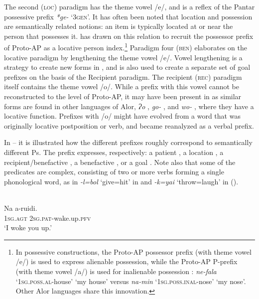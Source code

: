 \documentclass[output=paper]{LSP/langsci}
\begin{document}
The second (\textsc{loc}) paradigm has the theme vowel /e/, and is a reflex of the  Pantar possessive prefix \textit{*ge-} ‘\textsc{3gen}’. It has often been noted that location and possession are semantically related notions: an item is typically located at or near the person that possesses it.  has drawn on this relation to recruit the possessor prefix of Proto-AP as a locative person index.\footnote{In  possessive constructions, the Proto-AP possessor prefix (with theme vowel /e/) is used to express alienable possession, while the
 Proto-AP P-prefix (with theme vowel /a/) is used for inalienable possession \citep{Kratochvil2007Grammar}: \textit{ne-fala} ‘1\textsc{sg}.\textsc{poss}.\textsc{al}-house’ ‘my house’ versus \textit{na-min} ‘1\textsc{sg}.\textsc{poss}.\textsc{inal}-nose’ ‘my nose’. Other Alor languages share this innovation.} Paradigm four (\textsc{ben}) elaborates on the locative paradigm by lengthening the theme vowel /e/. Vowel lengthening is a strategy to create new forms in , and is also used to create a separate set of goal prefixes on the basis of the Recipient paradigm. The recipient (\textsc{rec}) paradigm itself contains the theme vowel /o/. While a prefix with this vowel cannot be reconstructed to the level of Proto-AP, it may have been present in  as similar forms are found in other languages of Alor, \eg {} \textit{Ɂo} \citep{Haan2001Grammar},  \textit{go-} \citep{Baird2008Grammar}, and  \textit{wo-} \citep{Schapper2014Kamang}, where they have a locative
function. Prefixes with /o/ might have evolved from a word that was
originally locative postposition or verb, and became reanalyzed as a
verbal prefix.

In -- it is illustrated how the different  prefixes roughly correspond to semantically different Ps. The prefix expresses, respectively: a patient , a location , a recipient/benefactive , a benefactive , or a goal . Note also that some of the predicates are complex, consisting of two or more verbs forming a single phonological word, as in \emph{-l=bol} `give=hit' in  and \emph{-k=yai} `throw=laugh' in  (\cf \citealt{Klameretal2010Abui}).

\newpage  
\ea {}\\
\ea \label{03-kl-ex:17}
\gll Na a-ruidi.\\
1\textsc{sg}.\textsc{agt} 2\textsc{sg}.\textsc{pat}-wake.up.\textsc{pfv}\\
\glt ‘I woke you up.’
\end{document}
